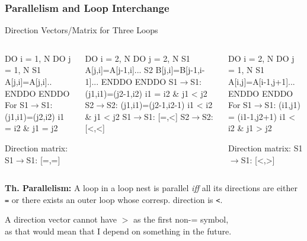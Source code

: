 \documentclass{beamer}
\newcommand{\emp}[1]{\textcolor{DikuRed}{ #1}}
\newcommand{\mymath}[1]{$ #1 $}
\begin{document}
\begin{frame}[fragile,t]
  \frametitle{Parallelism and Loop Interchange} %

\begin{block}{Direction Vectors/Matrix for Three Loops }
\begin{columns}
\begin{colorcode}
  DO i = 1, N
    DO j = 1, N
S1    A[j,i]=A[j,i]..
    ENDDO
  ENDDO
For S1\mymath{\rightarrow}S1: 
    (j1,i1)=(j2,i2) 
    i1 \emp{=} i2 \& j1 \emp{=} j2

Direction matrix:
S1\mymath{\rightarrow}S1: \emp{[=,=]}
\end{colorcode}
\begin{colorcode}
  DO i = 2, N
    DO j = 2, N
S1    A[j,i]=A[j-1,i]...
S2    B[j,i]=B[j-1,i-1]...
    ENDDO
  ENDDO
S1\mymath{\rightarrow}S1: (j1,i1)=(j2-1,i2)
        i1 \emp{=} i2 \& j1 \emp{<} j2
S2\mymath{\rightarrow}S2: (j1,i1)=(j2-1,i2-1)
        i1 \emp{<} i2 \& j1 \emp{<} j2
S1\mymath{\rightarrow}S1: \emp{[=,<]}
S2\mymath{\rightarrow}S2: \emp{[<,<]}
\end{colorcode}
\begin{colorcode}
  DO i = 2, N
    DO j = 1, N
S1    A[i,j]=A[i-1,j+1]...
    ENDDO
  ENDDO
For S1\mymath{\rightarrow}S1: 
    (i1,j1) = (i1-1,j2+1)
    i1 \emp{<} i2 \& j1 \emp{>} j2

Direction matrix:
S1\mymath{\rightarrow}S1: \emp{[<,>]}
\end{colorcode}
\end{columns}
\end{block} 

{\bf Th. Parallelism:} A loop in a loop nest is parallel {\em iff} all its directions
are either {\tt =} or there exists an outer loop whose corresp. direction is {\tt <}. 

\smallskip

\alert{A direction vector cannot have $>$ as the first non-= symbol},\\
as that would mean that I depend on something in the future. 
\end{frame}
\end{document}

